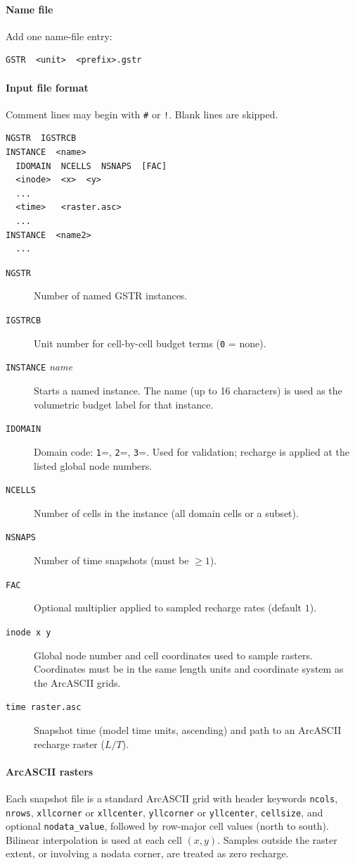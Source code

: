 \paragraph*{Name file}
Add one name-file entry:
\begin{verbatim}
GSTR  <unit>  <prefix>.gstr
\end{verbatim}

\paragraph*{Input file format}
Comment lines may begin with \texttt{\#} or \texttt{!}. Blank lines are skipped.

\begin{verbatim}
NGSTR  IGSTRCB
INSTANCE  <name>
  IDOMAIN  NCELLS  NSNAPS  [FAC]
  <inode>  <x>  <y>
  ...
  <time>   <raster.asc>
  ...
INSTANCE  <name2>
  ...
\end{verbatim}

\begin{description}
\item[\texttt{NGSTR}] Number of named GSTR instances.
\item[\texttt{IGSTRCB}] Unit number for cell-by-cell budget terms (\texttt{0} = none).
\item[\texttt{INSTANCE} \textit{name}] Starts a named instance. The name (up to 16 characters) is used as the volumetric budget label for that instance.
\item[\texttt{IDOMAIN}] Domain code: \texttt{1}=\gwf, \texttt{2}=\cln, \texttt{3}=\swf. Used for validation; recharge is applied at the listed global node numbers.
\item[\texttt{NCELLS}] Number of cells in the instance (all domain cells or a subset).
\item[\texttt{NSNAPS}] Number of time snapshots (must be $\ge 1$).
\item[\texttt{FAC}] Optional multiplier applied to sampled recharge rates (default $1$).
\item[\texttt{inode x y}] Global node number and cell coordinates used to sample rasters. Coordinates must be in the same length units and coordinate system as the ArcASCII grids.
\item[\texttt{time raster.asc}] Snapshot time (model time units, ascending) and path to an ArcASCII recharge raster ($L/T$).
\end{description}

\paragraph*{ArcASCII rasters}
Each snapshot file is a standard ArcASCII grid with header keywords
\texttt{ncols}, \texttt{nrows}, \texttt{xllcorner} or \texttt{xllcenter},
\texttt{yllcorner} or \texttt{yllcenter}, \texttt{cellsize}, and optional \texttt{nodata\_value},
followed by row-major cell values (north to south).
Bilinear interpolation is used at each cell $(x,y)$.
Samples outside the raster extent, or involving a nodata corner, are treated as zero recharge.

